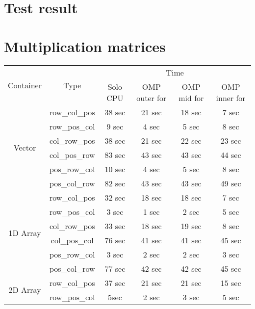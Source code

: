 \documentclass[11pt]{article}
\begin{document}
\pagestyle{empty}
\begin{center}
\section*{\huge{Test result}}
\section*{Multiplication matrices}
\end{center}
\begin{table}[H]
\centering
\begin{tabular}{ |c|c|c|c|c|c|  }
\hline 
\multirow{2}{*}{Container}  & \multirow{2}{*}{Type} & \multicolumn{4}{c|}{ Time} \\  \cline{3-6}

                            &                       &  Solo CPU& OMP outer for & OMP mid for & OMP inner for \\ 
\hline 
\multirow{6}{*}{Vector}     & row\_col\_pos & 38 sec & 21 sec & 18 sec & 7 sec \\
                            & row\_pos\_col & 9 sec & 4 sec & 5 sec & 8 sec \\
                            & col\_row\_pos & 38 sec & 21 sec & 22 sec & 23 sec \\  
                            & col\_pos\_row & 83 sec & 43 sec & 43 sec & 44 sec \\
                            & pos\_row\_col & 10 sec & 4 sec & 5 sec & 8 sec \\
                            & pos\_col\_row & 82 sec & 43 sec & 43 sec & 49 sec \\
\hline
\multirow{6}{*}{1D Array}   & row\_col\_pos & 32 sec & 18 sec & 18 sec & 7 sec \\
                            & row\_pos\_col & 3 sec & 1 sec & 2 sec & 5 sec \\
                            & col\_row\_pos & 33 sec & 18 sec & 19 sec & 8 sec \\  
                            & col\_pos\_col & 76 sec & 41 sec & 41 sec & 45 sec \\
                            & pos\_row\_col & 3 sec & 2 sec & 2 sec & 3 sec \\
                            & pos\_col\_row & 77 sec & 42 sec & 42 sec & 45 sec \\
\hline
\multirow{6}{*}{2D Array}   & row\_col\_pos & 37 sec & 21 sec & 21 sec & 15 sec \\
                            & row\_pos\_col & 5sec & 2 sec & 3 sec & 5 sec \\

\end{tabular}
\end{table}
\end{document}
